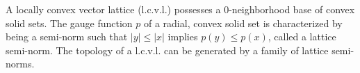A locally convex vector lattice (l.c.v.l.) possesses a 0-neighborhood base of convex solid sets. The gauge function $p$ of a radial, convex solid set is characterized by being a semi-norm such that $|y| \leq |x|$ implies $p(y) \leq p(x)$, called a lattice semi-norm. The topology of a l.c.v.l. can be generated by a family of lattice semi-norms.

